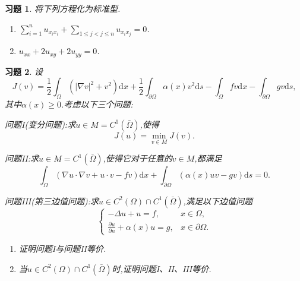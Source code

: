 \documentclass[a4paper,oneside,12pt]{ctexart}
\theoremstyle{plain}
\newtheorem{exercise}{习题}[section]
\theoremstyle{nonumberplain}
\theoremstyle{nonumberplain}
\newcommand{\dif}{\mathrm{d}}
\newcommand{\ptl}{\partial}
\newcommand{\abs}[1]{\left\vert#1\right\vert}
\begin{document}
    \begin{exercise}
        \label{ex:1.2}
        将下列方程化为标准型.
        \begin{enumerate}
            \item $\sum_{i=1}^nu_{x_ix_i}+\sum_{1\leqslant j<j\leqslant n}u_{x_ix_j}=0$.
            \item $u_{xx}+2u_{xy}+2u_{yy}=0$.
        \end{enumerate}
    \end{exercise}

    \begin{exercise}
        \label{ex:1.3}
        设
        \begin{equation*}
            J(v)=\frac{1}{2}\int_\Omega(\abs{\nabla v}^2+v^2)\dif x+\frac{1}{2}\int_{\ptl\Omega}\alpha(x)v^2\dif s-\int_\Omega fv\dif x-\int_{\ptl\Omega}gv\dif s,
        \end{equation*}
        其中$\alpha(x)\geqslant 0$.考虑以下三个问题:
        
        问题I(变分问题):求$u\in M=C^1(\bar{\Omega})$,使得
        \begin{equation*}
            J(u)=\min_{v\in M}J(v).
        \end{equation*}

        问题II:求$u\in M=C^1(\bar{\Omega})$,使得它对于任意的$v\in M$,都满足
        \begin{equation*}
            \int_\Omega(\nabla u\cdot\nabla v+u\cdot v-fv)\dif x+\int_{\ptl\Omega}(\alpha(x)uv-gv)\dif s=0.
        \end{equation*}
        
        问题III(第三边值问题):求$u\in C^2(\Omega)\cap C^1(\bar{\Omega})$,满足以下边值问题
        \begin{equation*}
            \begin{cases}
                -\Delta u+u=f,&x\in\Omega,\\
                \frac{\ptl u}{\ptl n}+\alpha(x)u=g,&x\in\ptl\Omega.
            \end{cases}
        \end{equation*}

        \begin{enumerate}
            \item 证明问题I与问题II等价.
            \item 当$u\in C^2(\Omega)\cap C^1(\bar{\Omega})$时,证明问题I、II、III等价.
        \end{enumerate}
    \end{exercise}
\end{document}
